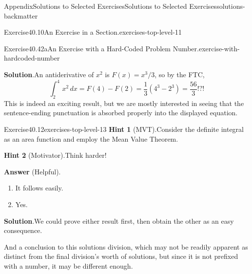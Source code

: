 \documentclass[twoside,10pt,]{article}
\newcommand{\blocktitlefont}{\relax}
\numberwithin{equation}{section}
\newcommand{\definiteintegral}[4]{\int_{#1}^{#2}\,#3\,d#4}
\begin{document}
\begin{solutions-section}{Appendix}{Solutions to Selected Exercises}{}{Solutions to Selected Exercises}{}{}{solutions-backmatter}
\begin{divisionsolution}{Exercise}{40.10}{An Exercise in a Section.}{exercises-top-level-11}
\end{divisionsolution}%
\begin{divisionsolution}{Exercise}{40.42a}{An Exercise with a Hard-Coded Problem Number.}{exercise-with-hardcoded-number}%
\par\smallskip%
\noindent\textbf{\blocktitlefont Solution}.\hypertarget{solution-antiderivative-back}{}\quad{}An antiderivative of \(x^2\) is \(F(x)=x^3/3\), so by the FTC,%
\begin{equation*}
\definiteintegral{2}{4}{x^2}{x}=F(4)-F(2)=\frac{1}{3}\left(4^3-2^3\right)=\frac{56}{3}\text{!?!}
\end{equation*}
This is indeed an exciting result, but we are mostly interested in seeing that the sentence-ending punctuation is absorbed properly into the displayed equation.%
\end{divisionsolution}%
\begin{divisionsolution}{Exercise}{40.12}{}{exercises-top-level-13}%
\noindent\textbf{\blocktitlefont Hint 1} (MVT).\hypertarget{exercises-top-level-13-2-back}{}\quad{}Consider the definite integral as an area function and employ the Mean Value Theorem.%
\par\smallskip%
\noindent\textbf{\blocktitlefont Hint 2} (Motivator).\hypertarget{exercise-complicated-second-hint-back}{}\quad{}Think harder!%
\par\smallskip%
\noindent\textbf{\blocktitlefont Answer} (Helpful).\hypertarget{exercise-complicated-first-answer-back}{}\quad{}%
\begin{enumerate}[label={(\alph*)}]
\item{}It follows easily.%
\item{}Yes.%
\end{enumerate}
%
\par\smallskip%
\noindent\textbf{\blocktitlefont Solution}.\hypertarget{exercises-top-level-13-5-back}{}\quad{}We could prove either result first, then obtain the other as an easy consequence.%
\end{divisionsolution}%
\begin{conclusion}{}%
And a conclusion to this solutions division, which may not be readily apparent as distinct from the final division's worth of solutions, but since it is not prefixed with a number, it may be different enough.%
\end{conclusion}%
\end{solutions-section}
%
%
\typeout{************************************************}
\typeout{************************************************}
\end{document}
